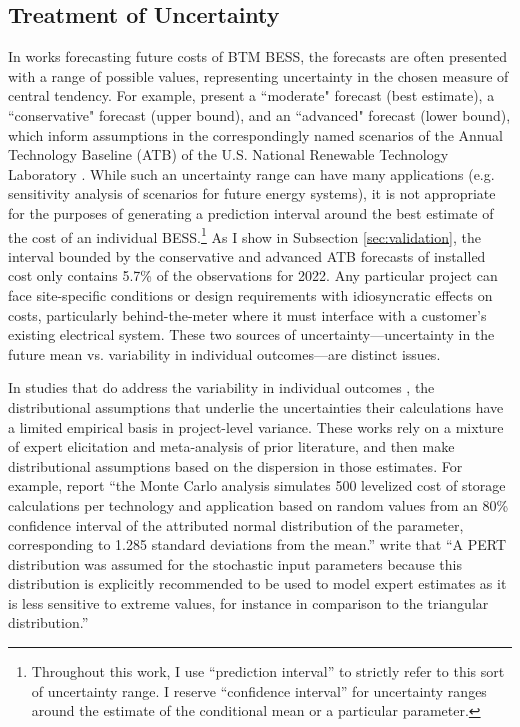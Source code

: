 \documentclass[preprint,12pt,authoryear]{elsarticle}
\begin{document}
\subsection{Treatment of Uncertainty}\label{sec:lit_uncertainty}

In works forecasting future costs of BTM BESS, the forecasts are often presented with a range of possible values, representing uncertainty in the chosen measure of central tendency. For example, \citet{augustineblair2021} present a ``moderate" forecast (best estimate), a ``conservative" forecast (upper bound), and an ``advanced" forecast (lower bound), which inform assumptions in the correspondingly named scenarios of the Annual Technology Baseline (ATB) of the U.S. National Renewable Technology Laboratory . While such an uncertainty range can have many applications (e.g. sensitivity analysis of scenarios for future energy systems), it is not appropriate for the purposes of generating a prediction interval around the best estimate of the cost of an individual BESS.\footnote{Throughout this work, I use ``prediction interval'' to strictly refer to this sort of uncertainty range. I reserve ``confidence interval'' for uncertainty ranges around the estimate of the conditional mean or a particular parameter.} As I show in Subsection \ref{sec:validation}, the interval bounded by the conservative and advanced ATB forecasts of installed cost only contains 5.7\% of the observations for 2022. Any particular project can face site-specific conditions or design requirements with idiosyncratic effects on costs, particularly behind-the-meter where it must interface with a customer's existing electrical system. These two sources of uncertainty---uncertainty in the future mean vs. variability in individual outcomes---are distinct issues.

In studies that do address the variability in individual outcomes \citep{battke2013,zakeri2015,obi2017,schmidt2019}, the distributional assumptions that underlie the uncertainties their calculations have a limited empirical basis in project-level variance. These works rely on a mixture of expert elicitation and meta-analysis of prior literature, and then make distributional assumptions based on the dispersion in those estimates. For example, \citet{schmidt2019} report ``the Monte Carlo analysis simulates 500 levelized cost of storage calculations per technology and application based on random values from an 80\% confidence interval of the attributed normal distribution of the parameter, corresponding to 1.285 standard deviations from the mean.'' \citet{battke2013} write that ``A PERT distribution was assumed for the stochastic input parameters because this distribution is explicitly recommended to be used to model expert estimates as it is less sensitive to extreme values, for instance in comparison to the triangular distribution.'' 
\end{document}

